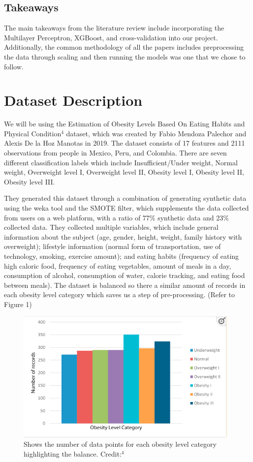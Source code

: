 \documentclass[11pt]{article}
\begin{document}
\subsection{Takeaways}
The main takeaways from the literature review include incorporating the Multilayer Perceptron, XGBoost, and cross-validation into our project. Additionally, the common methodology of all the papers includes preprocessing the data through scaling and then running the models was one that we chose to follow. 

\section{Dataset Description}
We will be using the Estimation of Obesity Levels Based On Eating Habits and Physical Condition$^{4}$ dataset, which was created by Fabio Mendoza Palechor and Alexis De la Hoz Manotas in 2019. The dataset consists of 17 features and 2111 observations from people in Mexico, Peru, and Colombia. There are seven different classification labels which include Insufficient/Under weight, Normal weight, Overweight level I, Overweight level II, Obesity level I, Obesity level II, Obesity level III. 

They generated this dataset through a combination of generating synthetic data using the weka tool and the SMOTE filter, which supplements the data collected from users on a web platform, with a ratio of 77\% synthetic data and 23\% collected data. They collected multiple variables, which include general information about the subject (age, gender, height, weight, family history with overweight); lifestyle information (normal form of transportation, use of technology, smoking, exercise amount); and eating habits (frequency of eating high caloric food, frequency of eating vegetables, amount of meals in a day, consumption of alcohol, consumption of water, calorie tracking, and eating food between meals). The dataset is balanced so there a similar amount of records in each obesity level category which saves us a step of pre-processing. (Refer to Figure 1)

\begin{figure}[h]
    \centering
    \includegraphics[width=0.5\linewidth]{balancedDataPic.png}
    \captionsetup{font=small}
    \caption{Shows the number of data points for each obesity level category highlighting the balance. Credit:$^{4}$}
    \label{fig:enter-label}
\end{figure}
\end{document}
